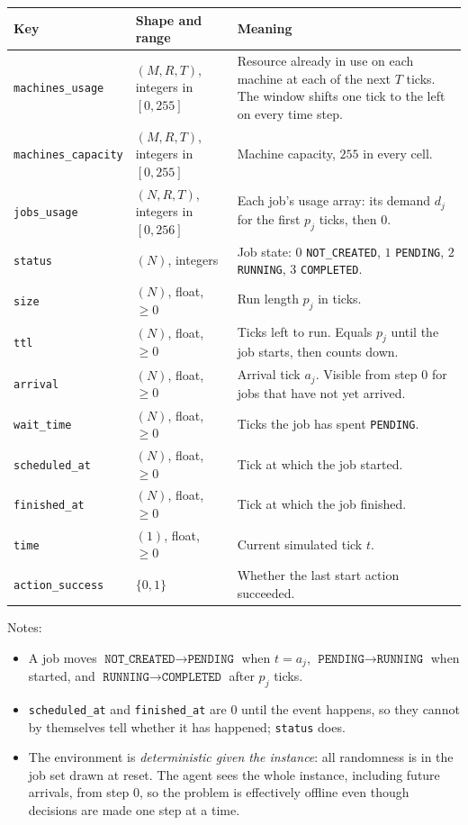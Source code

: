 \documentclass[11pt]{article}
\newcommand{\code}[1]{\texttt{#1}}
\newcommand{\N}{N}              %
\newcommand{\R}{R}              %
\newcommand{\Tw}{T}             %
\begin{document}
\begin{center}
\small
\begin{tabular}{@{}llp{6.4cm}@{}}
\toprule
Key & Shape and range & Meaning \\
\midrule
\code{machines\_usage} & $(M,\R,\Tw)$, integers in $[0,255]$ & Resource already in use on each machine at each of the next $\Tw$ ticks. The window shifts one tick to the left on every time step. \\
\code{machines\_capacity} & $(M,\R,\Tw)$, integers in $[0,255]$ & Machine capacity, $255$ in every cell. \\
\code{jobs\_usage} & $(\N,\R,\Tw)$, integers in $[0,256]$ & Each job's usage array: its demand $d_j$ for the first $p_j$ ticks, then $0$. \\
\code{status} & $(\N)$, integers & Job state: $0$ \code{NOT\_CREATED}, $1$ \code{PENDING}, $2$ \code{RUNNING}, $3$ \code{COMPLETED}. \\
\code{size} & $(\N)$, float, $\ge 0$ & Run length $p_j$ in ticks. \\
\code{ttl} & $(\N)$, float, $\ge 0$ & Ticks left to run. Equals $p_j$ until the job starts, then counts down. \\
\code{arrival} & $(\N)$, float, $\ge 0$ & Arrival tick $a_j$. Visible from step $0$ for jobs that have not yet arrived. \\
\code{wait\_time} & $(\N)$, float, $\ge 0$ & Ticks the job has spent \code{PENDING}. \\
\code{scheduled\_at} & $(\N)$, float, $\ge 0$ & Tick at which the job started. \\
\code{finished\_at} & $(\N)$, float, $\ge 0$ & Tick at which the job finished. \\
\code{time} & $(1)$, float, $\ge 0$ & Current simulated tick $t$. \\
\code{action\_success} & $\{0,1\}$ & Whether the last start action succeeded. \\
\bottomrule
\end{tabular}
\end{center}

Notes:
\begin{itemize}[noitemsep]
  \item A job moves $\code{NOT\_CREATED} \to \code{PENDING}$ when $t = a_j$, $\code{PENDING} \to \code{RUNNING}$ when started, and $\code{RUNNING} \to \code{COMPLETED}$ after $p_j$ ticks.
  \item \code{scheduled\_at} and \code{finished\_at} are $0$ until the event happens, so they cannot by themselves tell whether it has happened; \code{status} does.
  \item The environment is \emph{deterministic given the instance}: all randomness is in the job set drawn at reset. The agent sees the whole instance, including future arrivals, from step $0$, so the problem is effectively offline even though decisions are made one step at a time.
\end{itemize}
\end{document}
